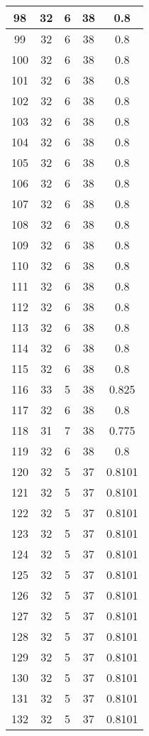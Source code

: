 \documentclass[letterpaper, 12pt]{article}
\begin{document}
\begin{longtable}{|c|c|c|c|c|}
\hline
98 & 32 & 6 & 38 & 0.8 \\
\hline
99 & 32 & 6 & 38 & 0.8 \\
\hline
100 & 32 & 6 & 38 & 0.8 \\
\hline
101 & 32 & 6 & 38 & 0.8 \\
\hline
102 & 32 & 6 & 38 & 0.8 \\
\hline
103 & 32 & 6 & 38 & 0.8 \\
\hline
104 & 32 & 6 & 38 & 0.8 \\
\hline
105 & 32 & 6 & 38 & 0.8 \\
\hline
106 & 32 & 6 & 38 & 0.8 \\
\hline
107 & 32 & 6 & 38 & 0.8 \\
\hline
108 & 32 & 6 & 38 & 0.8 \\
\hline
109 & 32 & 6 & 38 & 0.8 \\
\hline
110 & 32 & 6 & 38 & 0.8 \\
\hline
111 & 32 & 6 & 38 & 0.8 \\
\hline
112 & 32 & 6 & 38 & 0.8 \\
\hline
113 & 32 & 6 & 38 & 0.8 \\
\hline
114 & 32 & 6 & 38 & 0.8 \\
\hline
115 & 32 & 6 & 38 & 0.8 \\
\hline
116 & 33 & 5 & 38 & 0.825 \\
\hline
117 & 32 & 6 & 38 & 0.8 \\
\hline
118 & 31 & 7 & 38 & 0.775 \\
\hline
119 & 32 & 6 & 38 & 0.8 \\
\hline
120 & 32 & 5 & 37 & 0.8101 \\
\hline
121 & 32 & 5 & 37 & 0.8101 \\
\hline
122 & 32 & 5 & 37 & 0.8101 \\
\hline
123 & 32 & 5 & 37 & 0.8101 \\
\hline
124 & 32 & 5 & 37 & 0.8101 \\
\hline
125 & 32 & 5 & 37 & 0.8101 \\
\hline
126 & 32 & 5 & 37 & 0.8101 \\
\hline
127 & 32 & 5 & 37 & 0.8101 \\
\hline
128 & 32 & 5 & 37 & 0.8101 \\
\hline
129 & 32 & 5 & 37 & 0.8101 \\
\hline
130 & 32 & 5 & 37 & 0.8101 \\
\hline
131 & 32 & 5 & 37 & 0.8101 \\
\hline
132 & 32 & 5 & 37 & 0.8101 \\

\end{longtable}
\end{document}
